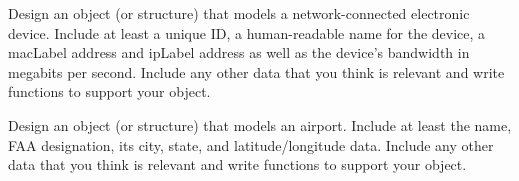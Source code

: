 \begin{exer}
\label{exercise:networkObject}
Design an object (or structure) that models a network-connected
electronic device.  Include at least a unique ID, a human-readable
name for the device, a \gls{macLabel} address and \gls{ipLabel}
address as well as the device's bandwidth in megabits per second.
Include any other data that you think is relevant and write functions 
to support your object.
\end{exer}

\begin{exer}
\label{exercise:airportObject}
Design an object (or structure) that models an airport.
Include at least the name, FAA designation, 
its city, state, and latitude/longitude data.  Include any other 
data that you think is relevant and write functions to support your 
object.
\end{exer}


